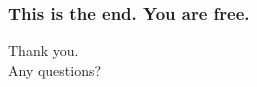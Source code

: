 \documentclass[20pt]{beamer}
\renewcommand{\(}[1]{\begin{columns}[#1]}
\renewcommand{\)}{\end{columns}}
\newcommand{\<}[1]{\begin{column}{#1\textwidth}}
\renewcommand{\>}{\end{column}}
\begin{document}
{


\begin{frame}
  \frametitle{This is the end. You are free.}

  \small
  \vspace{2.4cm}
  \begin{center}
  Thank you.\\
  Any questions?
  \end{center}
\end{frame}

}


\end{document}
